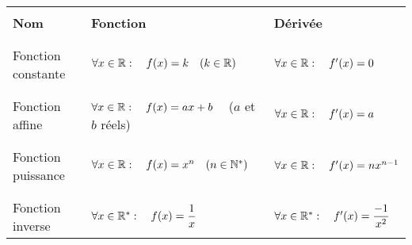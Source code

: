 \documentclass[10pt]{article}
\begin{document}
\begin{tabular}{|l|l|l|}
	\hline
	                           &                                                              &                                                       \\
	\textbf{Nom}               & \textbf{Fonction}                                            & \textbf{Dérivée}                                      \\
	                           &                                                              &                                                       \\
	\hline
	                           &                                                              &                                                       \\
	Fonction constante         & $\forall x\in\mathbb{R}: \quad f(x)=k \quad (k\in\mathbb{R})$                & $\forall x\in\mathbb{R} : \quad  f'(x)=0$                     \\
	                           &                                                              &                                                       \\
	\hline
	                           &                                                              &                                                       \\
	Fonction affine            & $\forall x\in\mathbb{R}: \quad f(x)=ax+b \quad$ ($a$ et $b$ réels)   & $\forall x\in\mathbb{R} : \quad  f'(x)=a$                    \\
	                           &                                                              &                                                       \\
	\hline
	                           &                                                              &                                                       \\
	Fonction puissance         & $\forall x\in\mathbb{R}: \quad f(x)=x^n \quad (n\in\mathbb{N}^*)$            & $\forall x\in\mathbb{R} : \quad  f'(x)=nx^{n-1}$              \\
	                           &                                                              &                                                       \\
	\hline
	                           &                                                              &                                                       \\
	Fonction inverse           & $\forall x\in\mathbb{R}^*: \quad f(x)=\dfrac{1}{x}$                    & $\forall x\in\mathbb{R}^* : \quad  f'(x)=\dfrac{-1}{x^2}$       \\

\end{tabular}
\end{document}
